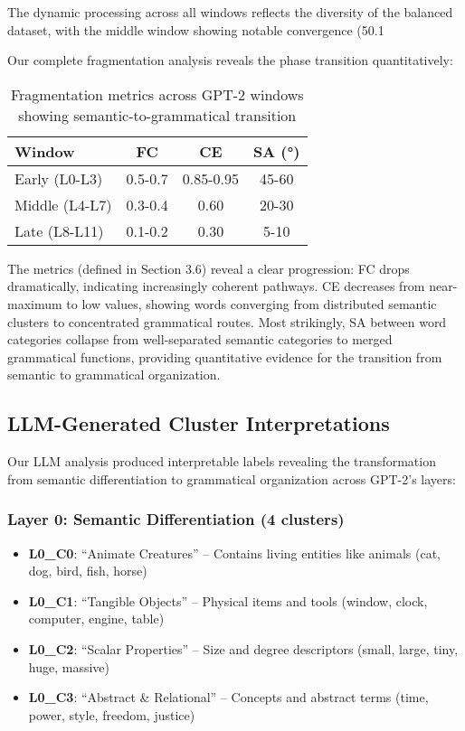 The dynamic processing across all windows reflects the diversity of the balanced dataset, with the middle window showing notable convergence (50.1%

Our complete fragmentation analysis reveals the phase transition quantitatively:

\begin{table}[h!]
\centering
\caption{Fragmentation metrics across GPT-2 windows showing semantic-to-grammatical transition}
\label{tab:gpt2_fragmentation}
\begin{tabular}{lccc}
\toprule
Window & FC & CE & SA (°) \\
\midrule
Early (L0-L3) & 0.5-0.7 & 0.85-0.95 & 45-60 \\
Middle (L4-L7) & 0.3-0.4 & 0.60 & 20-30 \\
Late (L8-L11) & 0.1-0.2 & 0.30 & 5-10 \\
\bottomrule
\end{tabular}
\end{table}

The metrics (defined in Section 3.6) reveal a clear progression: FC drops dramatically, indicating increasingly coherent pathways. CE decreases from near-maximum to low values, showing words converging from distributed semantic clusters to concentrated grammatical routes. Most strikingly, SA between word categories collapse from well-separated semantic categories to merged grammatical functions, providing quantitative evidence for the transition from semantic to grammatical organization.

\subsection{LLM-Generated Cluster Interpretations}

Our LLM analysis produced interpretable labels revealing the transformation from semantic differentiation to grammatical organization across GPT-2's layers:

\subsubsection{Layer 0: Semantic Differentiation (4 clusters)}
\begin{itemize}
    \item \textbf{L0\_C0}: ``Animate Creatures'' -- Contains living entities like animals (cat, dog, bird, fish, horse)
    \item \textbf{L0\_C1}: ``Tangible Objects'' -- Physical items and tools (window, clock, computer, engine, table)
    \item \textbf{L0\_C2}: ``Scalar Properties'' -- Size and degree descriptors (small, large, tiny, huge, massive)
    \item \textbf{L0\_C3}: ``Abstract \& Relational'' -- Concepts and abstract terms (time, power, style, freedom, justice)
\end{itemize}

